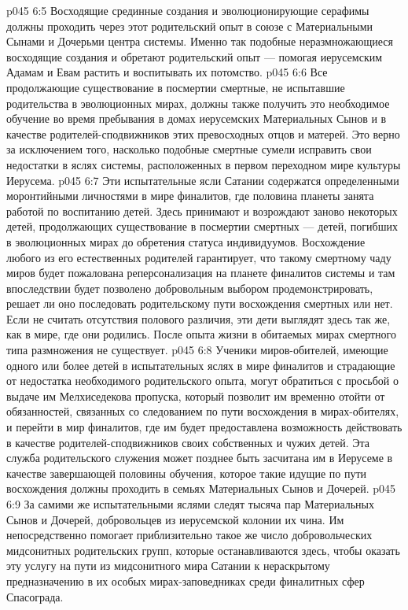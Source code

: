 \vs p045 6:5 Восходящие срединные создания и эволюционирующие серафимы должны проходить через этот родительский опыт в союзе с Материальными Сынами и Дочерьми центра системы. Именно так подобные неразмножающиеся восходящие создания и обретают родительский опыт --- помогая иерусемским Адамам и Евам растить и воспитывать их потомство.
\vs p045 6:6 Все продолжающие существование в посмертии смертные, не испытавшие родительства в эволюционных мирах, должны также получить это необходимое обучение во время пребывания в домах иерусемских Материальных Сынов и в качестве родителей\hyp{}сподвижников этих превосходных отцов и матерей. Это верно за исключением того, насколько подобные смертные сумели исправить свои недостатки в яслях системы, расположенных в первом переходном мире культуры Иерусема.
\vs p045 6:7 \pc Эти испытательные ясли Сатании содержатся определенными моронтийными личностями в мире финалитов, где половина планеты занята работой по воспитанию детей. Здесь принимают и возрождают заново некоторых детей, продолжающих существование в посмертии смертных --- детей, погибших в эволюционных мирах до обретения статуса индивидуумов. Восхождение любого из его естественных родителей гарантирует, что такому смертному чаду миров будет пожалована реперсонализация на планете финалитов системы и там впоследствии будет позволено добровольным выбором продемонстрировать, решает ли оно последовать родительскому пути восхождения смертных или нет. Если не считать отсутствия полового различия, эти дети выглядят здесь так же, как в мире, где они родились. После опыта жизни в обитаемых мирах смертного типа размножения не существует.
\vs p045 6:8 Ученики миров\hyp{}обителей, имеющие одного или более детей в испытательных яслях в мире финалитов и страдающие от недостатка необходимого родительского опыта, могут обратиться с просьбой о выдаче им Мелхиседекова пропуска, который позволит им временно отойти от обязанностей, связанных со следованием по пути восхождения в мирах\hyp{}обителях, и перейти в мир финалитов, где им будет предоставлена возможность действовать в качестве родителей\hyp{}сподвижников своих собственных и чужих детей. Эта служба родительского служения может позднее быть засчитана им в Иерусеме в качестве завершающей половины обучения, которое такие идущие по пути восхождения должны проходить в семьях Материальных Сынов и Дочерей.
\vs p045 6:9 За самими же испытательными яслями следят тысяча пар Материальных Сынов и Дочерей, добровольцев из иерусемской колонии их чина. Им непосредственно помогает приблизительно такое же число добровольческих мидсонитных родительских групп, которые останавливаются здесь, чтобы оказать эту услугу на пути из мидсонитного мира Сатании к нераскрытому предназначению в их особых мирах\hyp{}заповедниках среди финалитных сфер Спасограда.
